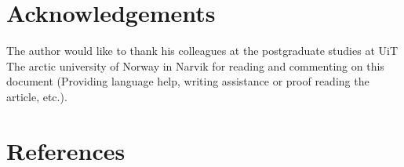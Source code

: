 \documentclass[a4paper,11pt]{extarticle}
\begin{document}
\section{Acknowledgements}
The author would like to thank his colleagues at the postgraduate studies at UiT The arctic university of Norway in Narvik for reading and commenting on this document (Providing language help, writing assistance or proof reading the article, etc.).

\section{References}
\begingroup
\def\section*#1{}


\endgroup


\end{document}
